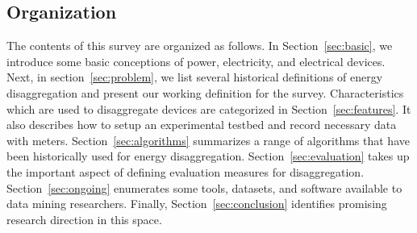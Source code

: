 \subsection{Organization}
The contents of this survey are organized as follows.
In Section~\ref{sec:basic}, we introduce some basic conceptions
of power, electricity, and electrical devices.
Next, in section~\ref{sec:problem},
we list several historical definitions of energy disaggregation
and present our working definition for the survey.
Characteristics which are used
to disaggregate devices are categorized in Section~\ref{sec:features}. 
It also describes how to setup an experimental testbed
and record necessary data with meters.
Section~\ref{sec:algorithms} summarizes a range of
algorithms that have been historically used for
energy disaggregation.
Section~\ref{sec:evaluation} takes up the important aspect of
defining evaluation measures for disaggregation.
Section~\ref{sec:ongoing} enumerates some tools, datasets, and software available to data mining researchers. Finally,
Section~\ref{sec:conclusion} identifies
promising research direction in this space.



